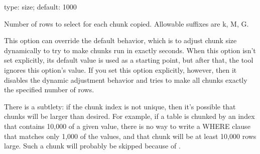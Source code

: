 \documentclass[letterpaper,10pt,english]{sphinxmanual}
\begin{document}
\begin{fulllineitems}
\label{\detokenize{mariadb-schema-change:cmdoption-mariadb-schema-change-chunk-size}}
\sphinxAtStartPar
type: size; default: 1000

\sphinxAtStartPar
Number of rows to select for each chunk copied.  Allowable suffixes are
k, M, G.

\sphinxAtStartPar
This option can override the default behavior, which is to adjust chunk size
dynamically to try to make chunks run in exactly {\hyperref[\detokenize{mariadb-schema-change:cmdoption-mariadb-schema-change-chunk-time}]{}} seconds.
When this option isn’t set explicitly, its default value is used as a starting
point, but after that, the tool ignores this option’s value.  If you set this
option explicitly, however, then it disables the dynamic adjustment behavior and
tries to make all chunks exactly the specified number of rows.

\sphinxAtStartPar
There is a subtlety: if the chunk index is not unique, then it’s possible that
chunks will be larger than desired. For example, if a table is chunked by an
index that contains 10,000 of a given value, there is no way to write a WHERE
clause that matches only 1,000 of the values, and that chunk will be at least
10,000 rows large.  Such a chunk will probably be skipped because of
{\hyperref[\detokenize{mariadb-schema-change:cmdoption-mariadb-schema-change-chunk-size-limit}]{}}.

\end{fulllineitems}

\end{document}
